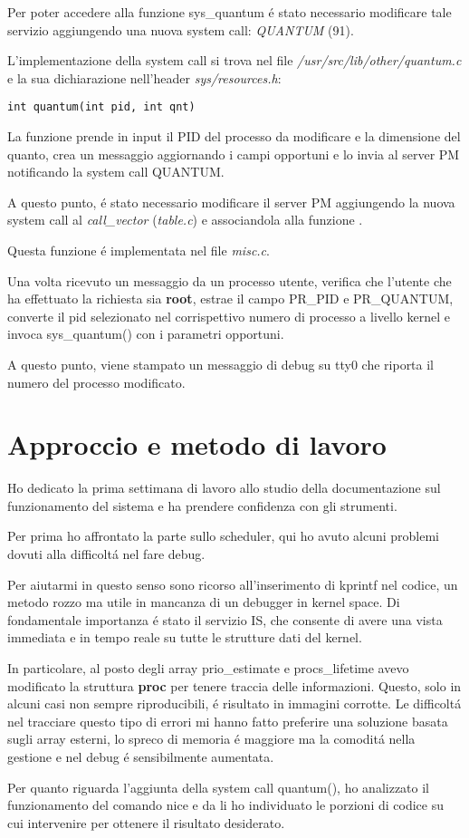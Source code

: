 \documentclass[a4paper,12pt]{report}
\begin{document}
Per poter accedere alla funzione sys\_quantum \'e stato necessario
modificare tale servizio aggiungendo una nuova system call: \textit{QUANTUM}
(91).

L'implementazione della system call si trova nel file
\textit{/usr/src/lib/other/quantum.c} e la sua dichiarazione nell'header
\textit{sys/resources.h}:
\begin{verbatim}
int quantum(int pid, int qnt)
\end{verbatim}

La funzione prende in input il PID del processo da modificare e la dimensione del quanto,
crea un messaggio aggiornando i campi opportuni e lo invia al
server PM notificando la system call QUANTUM.

A questo punto, \'e stato necessario modificare il server PM aggiungendo la
nuova system call al \textit{call\_vector} (\textit{table.c}) e associandola
alla funzione .

Questa funzione \'e implementata nel file \textit{misc.c}.

Una volta ricevuto un messaggio da un processo utente, verifica che l'utente
che ha effettuato la richiesta sia \textbf{root}, estrae il campo PR\_PID
e PR\_QUANTUM, converte il pid selezionato nel corrispettivo numero di
processo a livello kernel e invoca sys\_quantum() con i parametri opportuni.

A questo punto, viene stampato un messaggio di debug su tty0 che riporta il
numero del processo modificato.

\chapter{Approccio e metodo di lavoro}
Ho dedicato la prima settimana di lavoro allo studio della documentazione
sul funzionamento del sistema e ha prendere confidenza con gli strumenti.

Per prima ho affrontato la parte sullo scheduler, qui ho avuto alcuni
problemi dovuti alla difficolt\'a nel fare debug. 

Per aiutarmi in questo senso sono ricorso all'inserimento di kprintf nel
codice, un metodo rozzo ma utile in mancanza di un debugger in kernel space.
Di fondamentale importanza \'e stato il servizio IS, che consente di avere
una vista immediata e in tempo reale su tutte le strutture dati del kernel.

In particolare, al posto degli array prio\_estimate e procs\_lifetime avevo 
modificato la struttura \textbf{proc} per tenere traccia delle informazioni. 
Questo, solo in alcuni casi non sempre riproducibili, \'e risultato in immagini 
corrotte.
Le difficolt\'a nel tracciare questo tipo di errori mi hanno fatto preferire
una soluzione basata sugli array esterni, lo spreco di memoria \'e maggiore
ma la comodit\'a nella gestione e nel debug \'e sensibilmente aumentata.

Per quanto riguarda l'aggiunta della system call quantum(), ho analizzato il
funzionamento del comando nice e da li ho individuato le porzioni di codice su
cui intervenire per ottenere il risultato desiderato.
\end{document}
